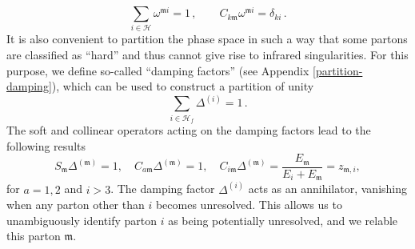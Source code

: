 \documentclass[a4paper, 12pt]{book}
\newcommand{\um}{\mathfrak{m}}
\begin{document}
\begin{equation}
    \sum_{i \in \mathcal{H}} \omega^{\um i} = 1 \, , \qquad C_{k\um}\omega^{\um i} = \delta_{ki} \,.
\end{equation}
It is also convenient to partition the phase space in such a way that some partons are classified as ``hard” and thus cannot give rise to infrared singularities. For this purpose, we define so-called ``damping factors” (see Appendix \ref{partition-damping}), which can be used to construct a partition of unity
\begin{equation}
  \sum_{i \in \mathcal{H}_f} \Delta^{(i)}=1 \, .
\end{equation}
The soft and collinear operators acting on the damping factors lead to the following results
\begin{equation}
S_\um \Delta^{(\um)} = 1, \quad C_{a\um} \Delta^{(\um)} = 1, \quad C_{i\um} \Delta^{(\um)} = \frac{E_\um}{E_i+ E_\um} =z_{\um,i},
\end{equation}
for $a = 1,2$ and $i > 3$. The damping factor $\Delta^{(i)}$ acts as an annihilator, vanishing when any parton other than $i$ becomes unresolved. This allows us to unambiguously identify parton $i$ as being potentially unresolved, and we relable this parton $\um$. \\
\end{document}
